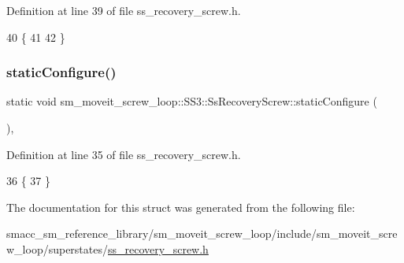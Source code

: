 Definition at line 39 of file ss\+\_\+recovery\+\_\+screw.\+h.


\begin{DoxyCode}
40             \{
41                 
42             \}
\end{DoxyCode}
\mbox{\label{structsm__moveit__screw__loop_1_1SS3_1_1SsRecoveryScrew_a76a6b8e0ef9b53e93014b19cddc21936}} 
\subsubsection{\texorpdfstring{static\+Configure()}{staticConfigure()}}
{\footnotesize\ttfamily static void sm\+\_\+moveit\+\_\+screw\+\_\+loop\+::\+S\+S3\+::\+Ss\+Recovery\+Screw\+::static\+Configure (\begin{DoxyParamCaption}{ }\end{DoxyParamCaption})\hspace{0.3cm}{\ttfamily [inline]}, {\ttfamily [static]}}



Definition at line 35 of file ss\+\_\+recovery\+\_\+screw.\+h.


\begin{DoxyCode}
36             \{
37             \}
\end{DoxyCode}


The documentation for this struct was generated from the following file\+:\begin{DoxyCompactItemize}
\item 
smacc\+\_\+sm\+\_\+reference\+\_\+library/sm\+\_\+moveit\+\_\+screw\+\_\+loop/include/sm\+\_\+moveit\+\_\+screw\+\_\+loop/superstates/\hyperlink{sm__moveit__screw__loop_2include_2sm__moveit__screw__loop_2superstates_2ss__recovery__screw_8h}{ss\+\_\+recovery\+\_\+screw.\+h}\end{DoxyCompactItemize}
